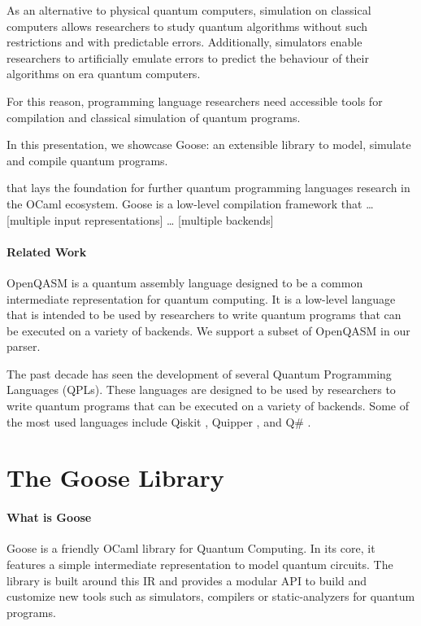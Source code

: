 \documentclass[a4paper]{easychair}
\begin{document}
As an alternative to physical quantum computers, simulation on classical computers allows researchers to study quantum algorithms without such restrictions and with predictable errors. Additionally, simulators enable researchers to artificially emulate errors to predict the behaviour of their algorithms on \nisq era quantum computers.

For this reason, programming language researchers need accessible tools for compilation and classical simulation of quantum programs.

In this presentation, we showcase Goose: an extensible library to model, simulate and compile quantum programs.

that lays the foundation for further quantum programming languages research in the OCaml ecosystem. Goose is a low-level compilation framework that … [multiple input representations] … [multiple backends]

\paragraph*{Related Work}

OpenQASM \cite{Cross22} is a quantum assembly language designed to be a common intermediate representation for quantum computing. It is a low-level language that is intended to be used by researchers to write quantum programs that can be executed on a variety of backends. We support a subset of OpenQASM in our parser.

The past decade has seen the development of several Quantum Programming Languages (QPLs). These languages are designed to be used by researchers to write quantum programs that can be executed on a variety of backends. Some of the most used languages include Qiskit \cite{Qiskit}, Quipper \cite{Green2013}, and Q# \cite{Svore2018}.

\section{The Goose Library}

\paragraph*{What is Goose} Goose is a friendly OCaml library for Quantum Computing. In its core, it features a simple intermediate representation to model quantum circuits. The library is built around this IR and provides a modular API to build and customize new tools such as simulators, compilers or static-analyzers for quantum programs.
\end{document}
